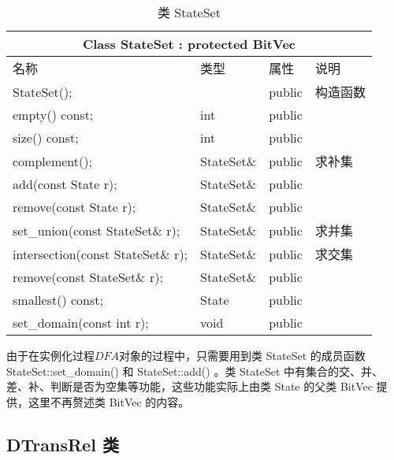 
\begin{table}[!htbp]
    \caption{类 StateSet}
    \label{tab:Class-StateSet}
    \centering
    \small%
    \setlength{\tabcolsep}{4pt}%
    \renewcommand{\arraystretch}{1.2}%
        \begin{tabular}{llll} %
        \toprule 
         \multicolumn{4}{c}{Class StateSet : protected BitVec} \\
        \midrule
        名称& 类型 & 属性  &\mbox{说明} \\
        \midrule 
        StateSet(); &  &  public & 构造函数 \\
        empty() const; & int & public & \\
        size() const;  & int & public & \\
        complement();  & StateSet\& & public & 求补集 \\
        add(const State r);  & StateSet\& & public &  \\
        remove(const State r);  & StateSet\& & public &  \\
        set\_union(const StateSet\& r);  & StateSet\& & public & 求并集 \\
        intersection(const StateSet\& r);  & StateSet\& & public & 求交集 \\
        remove(const StateSet\& r);  & StateSet\& & public &  \\
        smallest() const; & State & public & \\
        set\_domain(const int r); & void & public & \\
        \bottomrule 
    \end{tabular}
\end{table}

由于在实例化过程$DFA$对象的过程中，只需要用到类 StateSet 的成员函数 StateSet::set\_domain() 和 StateSet::add() 。类 StateSet 中有集合的交、并、差、补、判断是否为空集等功能，这些功能实际上由类 State 的父类 BitVec 提供，这里不再赘述类 BitVec 的内容。


\subsection{DTransRel 类}

